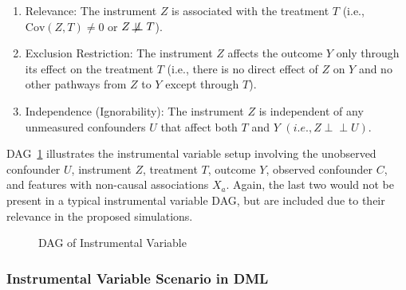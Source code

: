 \documentclass{article}
\numberwithin{equation}{section}
\begin{document}
\begin{enumerate}
\item Relevance: The instrument $Z$ is associated with the treatment  $T$  (i.e.,  $\text{Cov}(Z, T) \neq 0$  or \( Z \not\!\perp\!\!\!\perp T \)).
\item Exclusion Restriction: The instrument $Z$ affects the outcome $Y$ only through its effect on the treatment $T$ (i.e., there is no direct effect of $Z$ on $Y$ and no other pathways from $Z$ to $Y$ except through  $T$).
\item Independence (Ignorability): The instrument $Z$ is independent of any unmeasured confounders $U$ that affect both $T$ and $Y$ $(i.e.,  Z \perp\!\!\!\perp U )$.
\end{enumerate}

DAG~\ref{fig:dag_instrumental_variable} illustrates the instrumental variable setup involving the unobserved confounder $U$, instrument $Z$, treatment $T$, outcome $Y$, observed confounder $C$, and features with non-causal associations $X_a$. Again, the last two would not be present in a typical instrumental variable DAG, but are included due to their relevance in the proposed simulations.

\begin{figure}[H]
    \centering
    \caption{DAG of Instrumental Variable}
    \label{fig:dag_instrumental_variable}
\end{figure}
    
\subsubsection{Instrumental Variable Scenario in DML}
\end{document}

